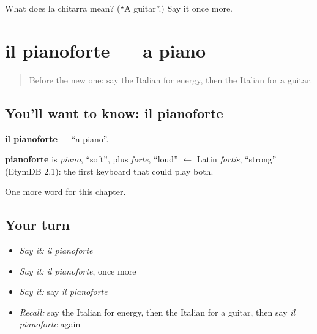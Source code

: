 \begin{tcolorbox}[breakable,colback=teal!4,colframe=teal!35!black,title={Before you move on}]
What does la chitarra mean? (\textquotedblleft{}A guitar\textquotedblright{}.) Say it once more.
\end{tcolorbox}
\section[il pianoforte]{il pianoforte — a piano}

\label{lesson:IT-C170-pianoforte}



\begin{quote}
Before the new one: say the Italian for energy, then the Italian for a guitar.
\end{quote}

\subsection*{You'll want to know: il pianoforte}
\textbf{il pianoforte} — \textquotedblleft{}a piano\textquotedblright{}.

\begin{cousinweb}
\textbf{pianoforte} is \emph{piano}, \textquotedblleft{}soft\textquotedblright{}, plus \emph{forte}, \textquotedblleft{}loud\textquotedblright{} $\leftarrow$ Latin \emph{fortis}, \textquotedblleft{}strong\textquotedblright{} (EtymDB 2.1): the first keyboard that could play both.
\end{cousinweb}

\begin{grammarlens}[title={What you've built}]
One more word for this chapter.
\end{grammarlens}

\subsection*{Your turn}
\begin{itemize}
\raggedright
  \item \emph{Say it:} \emph{il pianoforte}
  \item \emph{Say it:} \emph{il pianoforte}, once more
  \item \emph{Say it:} say \emph{il pianoforte}
  \item \emph{Recall:} say the Italian for energy, then the Italian for a guitar, then say \emph{il pianoforte} again
\end{itemize}

